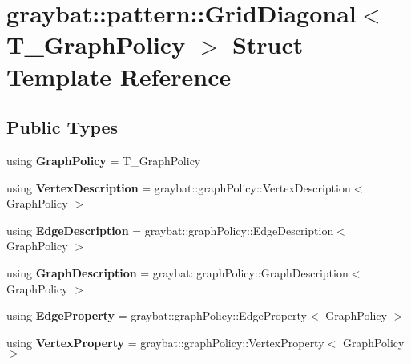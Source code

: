 \hypertarget{structgraybat_1_1pattern_1_1GridDiagonal}{}\section{graybat\+:\+:pattern\+:\+:Grid\+Diagonal$<$ T\+\_\+\+Graph\+Policy $>$ Struct Template Reference}
\label{structgraybat_1_1pattern_1_1GridDiagonal}
\subsection*{Public Types}
\begin{DoxyCompactItemize}
\item 
\hypertarget{structgraybat_1_1pattern_1_1GridDiagonal_a52fb9d0c427d98aade09744870b24db8}{}using {\bfseries Graph\+Policy} = T\+\_\+\+Graph\+Policy\label{structgraybat_1_1pattern_1_1GridDiagonal_a52fb9d0c427d98aade09744870b24db8}

\item 
\hypertarget{structgraybat_1_1pattern_1_1GridDiagonal_af427c167b2ebddcc06e3aefa6bcf01dc}{}using {\bfseries Vertex\+Description} = graybat\+::graph\+Policy\+::\+Vertex\+Description$<$ Graph\+Policy $>$\label{structgraybat_1_1pattern_1_1GridDiagonal_af427c167b2ebddcc06e3aefa6bcf01dc}

\item 
\hypertarget{structgraybat_1_1pattern_1_1GridDiagonal_a0a092e5c74f1372752d1524f57edcfec}{}using {\bfseries Edge\+Description} = graybat\+::graph\+Policy\+::\+Edge\+Description$<$ Graph\+Policy $>$\label{structgraybat_1_1pattern_1_1GridDiagonal_a0a092e5c74f1372752d1524f57edcfec}

\item 
\hypertarget{structgraybat_1_1pattern_1_1GridDiagonal_a896592ae4baad1915afc5fe16afd5c72}{}using {\bfseries Graph\+Description} = graybat\+::graph\+Policy\+::\+Graph\+Description$<$ Graph\+Policy $>$\label{structgraybat_1_1pattern_1_1GridDiagonal_a896592ae4baad1915afc5fe16afd5c72}

\item 
\hypertarget{structgraybat_1_1pattern_1_1GridDiagonal_ab4dafe2fdc7d2527dc5734c9cffffeba}{}using {\bfseries Edge\+Property} = graybat\+::graph\+Policy\+::\+Edge\+Property$<$ Graph\+Policy $>$\label{structgraybat_1_1pattern_1_1GridDiagonal_ab4dafe2fdc7d2527dc5734c9cffffeba}

\item 
\hypertarget{structgraybat_1_1pattern_1_1GridDiagonal_a594493381f0cfee671269f7be3402879}{}using {\bfseries Vertex\+Property} = graybat\+::graph\+Policy\+::\+Vertex\+Property$<$ Graph\+Policy $>$\label{structgraybat_1_1pattern_1_1GridDiagonal_a594493381f0cfee671269f7be3402879}

\end{DoxyCompactItemize}
